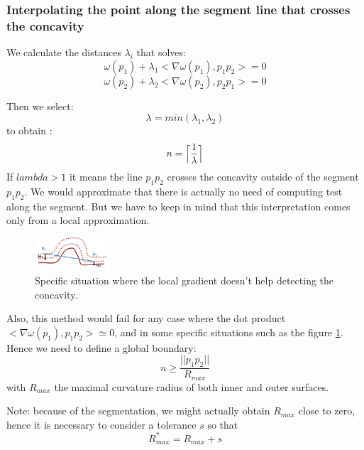 \documentclass[11pt,a4paper]{article}
\begin{document}
\subsubsection{Interpolating the point along the segment line that crosses the concavity} \label{subsec}
We calculate the distances $\lambda_i$ that solves:
\begin{equation}
\omega (p_1) + \lambda_1 <\nabla \omega(p_1), p_1p_2> = 0 
\end{equation}
\begin{equation}
\omega (p_2) + \lambda_2<\nabla \omega(p_2), p_2p_1> = 0
\end{equation}

Then we select:
\begin{equation}
\lambda = min(\lambda_1, \lambda_2)
\end{equation}
to obtain :
\begin{equation}
n = \Bigl\lceil \frac{1}{\lambda} \Bigr\rceil
\end{equation}
If $lambda > 1$ it means the line $p_1p_2$ crosses the concavity outside of the segment $p_1p_2$. We would approximate that there is actually no need of computing test along the segment. But we have to keep in mind that this interpretation comes only from a local approximation.

\begin{figure}[h!]
			\label{spe issue}
			\centering
			\includegraphics[width=0.25\textwidth]{Drawings/CurvatureTestExample1.png}
			\caption{Specific situation where the local gradient doesn't help detecting the concavity.}
\end{figure}
Also, this method would fail for any case where the dot product $<\nabla \omega(p_1), p_1p_2> \simeq 0$, and in some specific situations such as the figure \ref{spe issue}. Hence we need to define a global boundary:
\begin{equation}
n \geq \frac{||p_1p_2||}{R_{max}} 
\end{equation}
with $R_{max}$ the maximal curvature radius of both inner and outer surfaces.

Note: because of the segmentation, we might actually obtain $R_{max}$ close to zero, hence it is necessary to consider a tolerance $s$ so that 
\begin{equation}
R_{max}^* = R_{max} + s
\end{equation}
\end{document}
